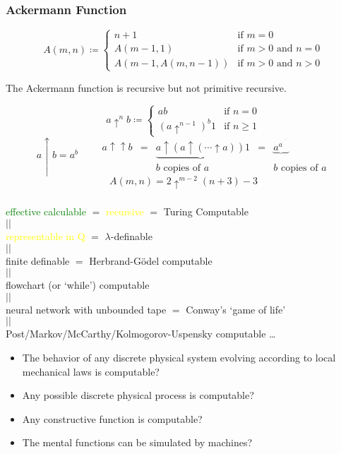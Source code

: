 \documentclass[UTF8,aspectratio=43,11pt,colorlinks,compress,openany]{beamer}%
\begin{document}
\begin{frame}\frametitle{Ackermann Function}
	\begin{definition}
		\[A(m,n)\coloneqq 
		\begin{cases}
		n+1&\mbox{if }m=0\\
		A(m-1,1)&{\mbox{if }}m>0{\mbox{ and }}n=0\\
		A(m-1,A(m,n-1))&{\mbox{if }}m>0{\mbox{ and }}n>0
		\end{cases}\]
	\end{definition}
	\begin{theorem}
		The Ackermann function is recursive but not primitive recursive.
	\end{theorem}
	\vspace{-1ex}
	\[a\uparrow^nb\coloneqq 
	\begin{cases}
	ab&{\mbox{if }}n=0\\
	(a\uparrow^{n-1})^b1&{\mbox{if }}n\geq 1
	\end{cases}\]
	\[a\uparrow b=a^b\qquad
	\begin{matrix}
	a\uparrow \uparrow b&=&\underbrace{a\uparrow(a\uparrow (\cdots \uparrow a))}1&=& \underbrace{a^{a^{{}^{.\,^{.\,^{.\,^{a}}}}}}}\\&&b{\mbox{ copies of }}a&&b{\mbox{ copies of }}a
	\end{matrix}\]
	\[A(m,n)=2\uparrow^{m-2}(n+3)-3\]
\end{frame}

\begin{frame}\frametitle{}
	\begin{thesis}
		\begin{center}
			\textcolor{green}{effective calculable} $=$ \textcolor{yellow}{recursive} $=$ Turing Computable\\
			$\scriptstyle ||$\\
			\textcolor{yellow}{representable in $\mathrm{Q}$} $=$ $\lambda$-definable\\
			$\scriptstyle ||$\\
			finite definable $=$ Herbrand-G\"odel computable\\
			$\scriptstyle ||$\\
			flowchart (or `while') computable\\
			$\scriptstyle ||$\\
			neural network with unbounded tape $=$ Conway's `game of life'\\
			$\scriptstyle ||$\\
			Post/Markov/McCarthy/Kolmogorov-Uspensky computable \ldots
		\end{center}
	\end{thesis}
	\begin{itemize}
		\item The behavior of any discrete physical system evolving according to local mechanical laws is computable?
		\item Any possible discrete physical process is computable?
		\item Any constructive function is computable?
		\item The mental functions can be simulated by machines?
	\end{itemize}
\end{frame}
\end{document}
